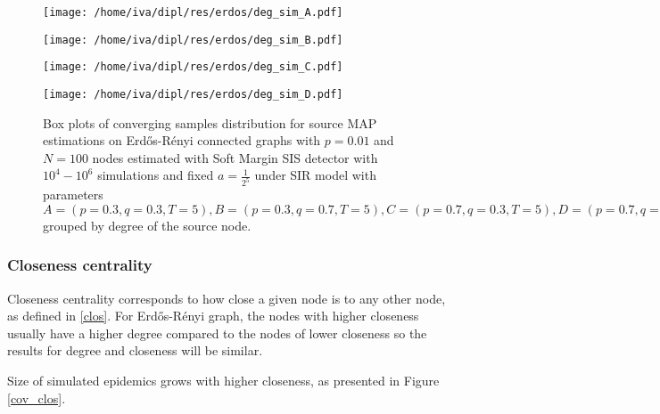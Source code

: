 \documentclass[times, utf8, diplomski]{fer}
\begin{document}
\begin{figure}[H]
\begin{minipage}{0.5\textwidth}
\texttt{[image: /home/iva/dipl/res/erdos/deg\_sim\_A.pdf]}
\end{minipage}
\begin{minipage}{0.5\textwidth}
\texttt{[image: /home/iva/dipl/res/erdos/deg\_sim\_B.pdf]}
\end{minipage}
\begin{minipage}{0.5\textwidth}
\texttt{[image: /home/iva/dipl/res/erdos/deg\_sim\_C.pdf]}
\end{minipage}
\begin{minipage}{0.5\textwidth}
\texttt{[image: /home/iva/dipl/res/erdos/deg\_sim\_D.pdf]}
\end{minipage}
\caption{Box plots of converging samples distribution for source MAP estimations on  Erd{\H{o}}s-R{\'{e}}nyi connected graphs with $p=0.01$ and $N=100$ nodes estimated with Soft Margin SIS detector with $10^4 - 10^6$ simulations and fixed $a = \frac{1}{2^5}$ under SIR model with parameters $A = (p=0.3, q=0.3, T=5), B = (p=0.3, q=0.7, T=5), C = (p=0.7, q=0.3, T=5), D = (p=0.7, q=0.7, T=5)$ grouped by degree of the source node.}
\label{erdos_sim_deg} 
\end{figure}

\subsubsection{Closeness centrality}

Closeness centrality corresponds to how close a given node is to any other node, as defined in \ref{clos}. For  Erd{\H{o}}s-R{\'{e}}nyi graph, the nodes with higher closeness usually have a higher degree compared to the nodes of lower closeness so the results for degree and closeness will be similar.

Size of simulated epidemics grows with higher closeness, as presented in Figure \ref{cov_clos}. 
\end{document}
